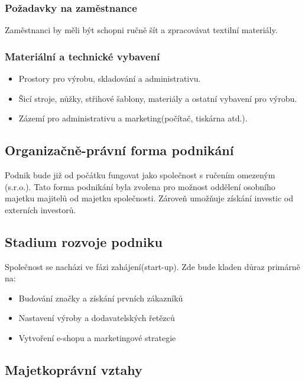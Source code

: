 \documentclass[12pt, a4paper]{article}
\begin{document}
\subsubsection{Požadavky na zaměstnance}
Zaměstnanci by měli být schopni ručně šít a zpracovávat textilní materiály.

\subsubsection{Materiální a technické vybavení}
\begin{itemize}
  \item Prostory pro výrobu, skladování a administrativu.
  \item Šicí stroje, nůžky, střihové šablony, materiály a ostatní vybavení pro výrobu.
  \item Zázemí pro administrativu a marketing(počítač, tiskárna atd.).
\end{itemize}

\subsection{Organizačně-právní forma podnikání}
Podnik bude již od počátku fungovat jako společnost s ručením omezeným (s.r.o.).
Tato forma podnikání byla zvolena pro možnost oddělení osobního majetku majitelů od majetku společnosti.
Zároveň umožňuje získání investic od externích investorů.

\subsection{Stadium rozvoje podniku}
Společnost se nacházi ve fázi zahájení(start-up). Zde bude kladen důraz primárně na:
\begin{itemize}
  \item Budování značky a získání prvních zákazníků
  \item Nastavení výroby a dodavatelských řetězců
  \item Vytvoření e-shopu a marketingové strategie
\end{itemize}

\subsection{Majetkoprávní vztahy}
\end{document}
